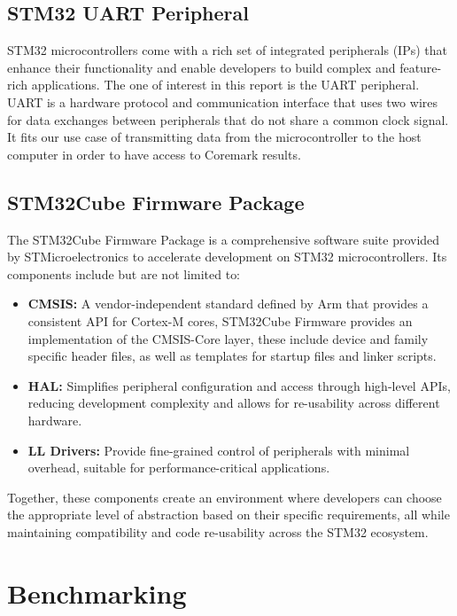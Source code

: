 \subsection{STM32 UART Peripheral}
STM32 microcontrollers come with a rich set of integrated peripherals (IPs) that enhance their functionality and enable developers to build complex and feature-rich applications. The one of interest in this report is the UART peripheral.
UART is a hardware protocol and communication interface that uses two wires for data exchanges between peripherals that do not share a common clock signal. It fits our use case of transmitting data from the microcontroller to the host computer in order to have access to Coremark results.
\newpage
\subsection{STM32Cube Firmware Package}
The STM32Cube Firmware Package is a comprehensive software suite provided by STMicroelectronics to accelerate development on STM32 microcontrollers. Its components include but are not limited to:
\begin{itemize}
    \item \textbf{CMSIS:} A vendor-independent standard defined by Arm that provides a consistent API for Cortex-M cores, STM32Cube Firmware provides an implementation of the CMSIS-Core layer, these include device and family specific header files, as well as templates for startup files and linker scripts.
    \item \textbf{HAL:} Simplifies peripheral configuration and access through high-level APIs, reducing development complexity and allows for re-usability across different hardware.
    \item \textbf{LL Drivers:} Provide fine-grained control of peripherals with minimal overhead, suitable for performance-critical applications.
\end{itemize}

Together, these components create an environment where developers can choose the appropriate level of abstraction based on their specific requirements, all while maintaining compatibility and code re-usability across the STM32 ecosystem.


\section{Benchmarking}
